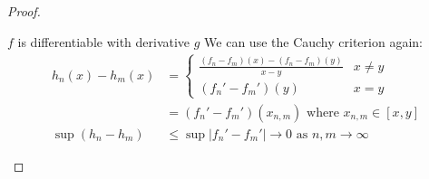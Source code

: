 \documentclass[../Main.tex]{subfiles}
\begin{document}
\begin{proof}
\begin{subproof}{$f$ is differentiable with derivative $g$}
        We can use the Cauchy criterion again:
        \begin{align*}
            h_n(x) - h_m(x) &=
            \begin{cases}
                \frac{(f_n - f_m)(x) - (f_n - f_m)(y)}{x - y} & x \neq y \\
                (f_n' - f_m')(y) & x = y
            \end{cases} \\
            &= (f_n' - f_m')(x_{n, m}) \text{ where } x_{n, m} \in [x, y] \\
            \sup (h_n - h_m) &\leq \sup |f_n' - f_m'| \to 0 \text{ as } n, m \to \infty
        \end{align*}
        
    \end{subproof}
    
\end{proof}
\end{document}
